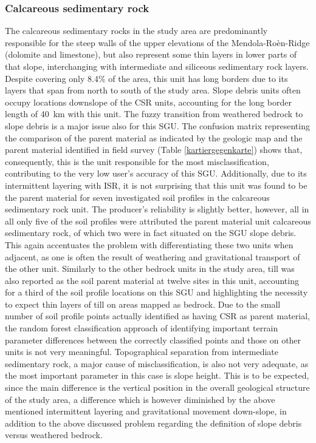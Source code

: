 \documentclass[preprint,12pt,authoryear]{elsarticle}
\begin{document}
\subsubsection{Calcareous sedimentary rock}
The calcareous sedimentary rocks in the study area are predominantly  responsible for the steep walls of the upper elevations of the  Mendola-Ro\`en-Ridge (dolomite and limestone), but also represent some thin layers in lower parts of that slope, interchanging with intermediate and siliceous sedimentary rock layers. Despite covering only 8.4\% of the area, this unit has long borders due to its layers that span from north to south of the study area. Slope debris units often occupy locations downslope of the CSR units, accounting for the long  border length of 40~km with this unit. The fuzzy transition from weathered bedrock to slope debris is a major issue also for this SGU. The confusion matrix representing the comparison of the parent material as indicated by the geologic map and the parent material identified in field survey (Table \ref{kartiergegenkarte}) shows that, consequently, this is the unit responsible for the most misclassification, contributing to the very low user's accuracy of this SGU. Additionally, due to its intermittent layering with ISR, it is not surprising that this unit was found to be the parent material for seven investigated soil profiles in the calcareous sedimentary rock unit. The producer's reliability is slightly better, however, all in all only five of the soil profiles were attributed the parent material unit calcareous sedimentary rock, of which two were in fact situated on the SGU slope debris. This again accentuates the problem with differentiating these two units when adjacent, as one is often the result of weathering and gravitational transport of the other unit. Similarly to the other bedrock units in the study area, till was also reported as the soil parent material at twelve sites in this unit, accounting for a third of the soil profile locations on this SGU and highlighting the necessity to expect thin layers of till on areas mapped as bedrock. Due to the small number of soil profile points actually identified as having CSR as parent material, the random forest classification approach of identifying important terrain parameter differences between the correctly classified points and those on other units is not very meaningful. Topographical separation from intermediate sedimentary rock, a major cause of misclassification, is also not very adequate, as the most important parameter in this case is slope height. This is to be expected, since the main difference is the vertical position in the overall geological structure of the study area, a difference which is however diminished by the above mentioned intermittent layering and gravitational movement down-slope, in addition to the above discussed problem regarding the definition of slope debris versus weathered bedrock.
\end{document}
